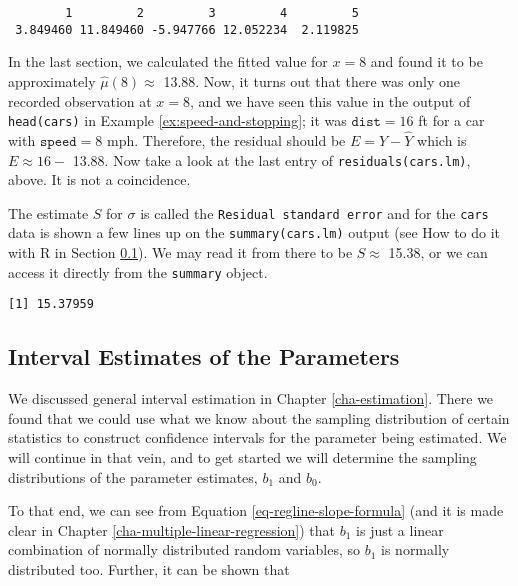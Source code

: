 \documentclass[]{book}
\newenvironment{Shaded}{\begin{snugshade}}{\end{snugshade}}
\newcommand{\KeywordTok}[1]{\textcolor[rgb]{0.13,0.29,0.53}{\textbf{{#1}}}}
\newcommand{\StringTok}[1]{\textcolor[rgb]{0.31,0.60,0.02}{{#1}}}
\newcommand{\NormalTok}[1]{{#1}}
\numberwithin{equation}{chapter}
\numberwithin{figure}{chapter}
\theoremstyle{plain}
\theoremstyle{definition}
\theoremstyle{remark}
\theoremstyle{definition}
\theoremstyle{definition}
\theoremstyle{remark}
\begin{document}
\begin{verbatim}
        1         2         3         4         5 
 3.849460 11.849460 -5.947766 12.052234  2.119825 
\end{verbatim}

In the last section, we calculated the fitted value for \(x=8\) and
found it to be approximately \(\hat{\mu}(8) \approx\) 13.88. Now, it
turns out that there was only one recorded observation at \(x = 8\), and
we have seen this value in the output of \texttt{head(cars)} in Example
\ref{ex:speed-and-stopping}; it was \(\mathtt{dist} = 16\) ft for a car
with \(\mathtt{speed} = 8\) mph. Therefore, the residual should be
\(E = Y - \hat{Y}\) which is \(E \approx 16 -\) 13.88. Now take a look
at the last entry of \texttt{residuals(cars.lm)}, above. It is not a
coincidence.

The estimate \(S\) for \(\sigma\) is called the
\texttt{Residual\ standard\ error} and for the \texttt{cars} data is
shown a few lines up on the \texttt{summary(cars.lm)} output (see How to
do it with R in Section \ref{sub-slr-interval-est-params}). We may read
it from there to be \(S\approx\) 15.38, or we can access it directly
from the \texttt{summary} object.

\begin{Shaded}
\end{Shaded}

\begin{verbatim}
[1] 15.37959
\end{verbatim}

\subsection{Interval Estimates of the
Parameters}\label{sub-slr-interval-est-params}

We discussed general interval estimation in Chapter
\ref{cha-estimation}. There we found that we could use what we know
about the sampling distribution of certain statistics to construct
confidence intervals for the parameter being estimated. We will continue
in that vein, and to get started we will determine the sampling
distributions of the parameter estimates, \(b_{1}\) and \(b_{0}\).

To that end, we can see from Equation \eqref{eq-regline-slope-formula}
(and it is made clear in Chapter \ref{cha-multiple-linear-regression})
that \(b_{1}\) is just a linear combination of normally distributed
random variables, so \(b_{1}\) is normally distributed too. Further, it
can be shown that
\end{document}
